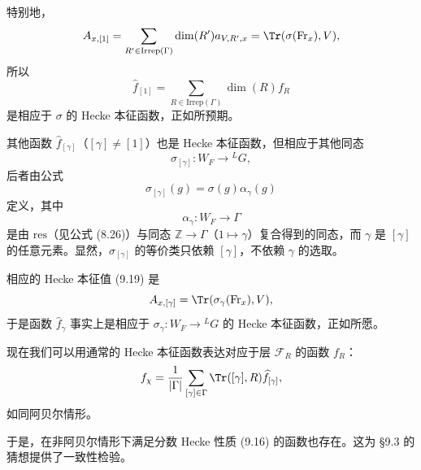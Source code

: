 
特别地，
\[
A_{x,[1]} = \sum_{R'\in\mathrm{Irrep}(\Gamma)}\dim(R')a_{V,R',x} = \Tr(\sigma(\mathrm{Fr}_x),V),
\]
所以
\[
\widehat{f}_{[1]} = \sum_{R\in\mathrm{Irrep}(\Gamma)}\dim(R)f_R
\]
是相应于 $\sigma$ 的 Hecke 本征函数，正如所预期。

其他函数 $\widehat{f}_{[\gamma]}$（$[\gamma]\neq[1]$）也是 Hecke 本征函数，但相应于其他同态
\[
\sigma_{[\gamma]}: W_F\to{}^{L}G,
\]
后者由公式
\[
\sigma_{[\gamma]}(g) = \sigma(g)\alpha_\gamma(g)
\]
定义，其中
\[
\alpha_\gamma: W_F\to\Gamma
\]
是由 $\mathrm{res}$（见公式 (8.26)）与同态 $\mathbb{Z}\to\Gamma$（$1\mapsto\gamma$）复合得到的同态，而 $\gamma$ 是 $[\gamma]$ 的任意元素。显然，$\sigma_{[\gamma]}$ 的等价类只依赖 $[\gamma]$，不依赖 $\gamma$ 的选取。

相应的 Hecke 本征值 (9.19) 是
\[
A_{x,[\gamma]} = \Tr(\sigma_\gamma(\mathrm{Fr}_x),V),
\]
于是函数 $\widehat{f}_\gamma$ 事实上是相应于 $\sigma_\gamma: W_F\to{}^{L}G$ 的 Hecke 本征函数，正如所愿。

现在我们可以用通常的 Hecke 本征函数表达对应于层 $\mathcal{F}_R$ 的函数 $f_R$：
\[
f_\chi = \frac{1}{|\Gamma|}\sum_{[\gamma]\in\Gamma}\Tr([\gamma],R)\widehat{f}_{[\gamma]},
\]
如同阿贝尔情形。

于是，在非阿贝尔情形下满足分数 Hecke 性质 (9.16) 的函数也存在。这为 §9.3 的猜想提供了一致性检验。

